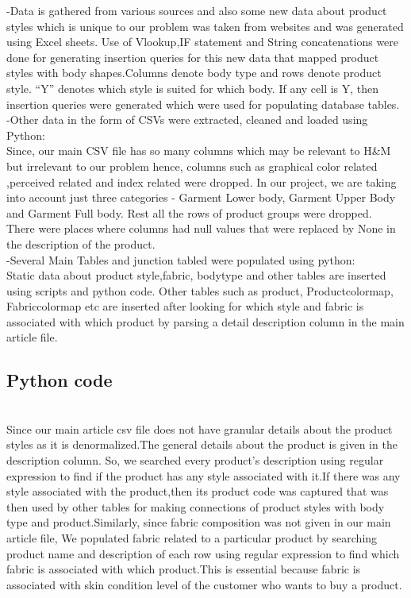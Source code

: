 \documentclass[11pt,journal,compsoc]{IEEEtran}
\begin{document}
-Data is gathered from various sources and also some new data about product styles which is unique to our problem was taken from websites and was generated using Excel sheets. Use of Vlookup,IF statement and String concatenations were done for generating insertion queries for this new data that mapped product styles with body shapes.Columns denote body type and rows denote product style. “Y” denotes which style is suited for which body. If any cell is Y, then insertion queries were generated which were used for populating database tables. \\


-Other data in the form of CSVs were extracted, cleaned and loaded using Python: \\
Since, our main CSV file has so many columns which may be relevant to H&M but irrelevant to our problem hence, columns such as graphical color related ,perceived related and index related were dropped.
In our project, we are taking into account just three categories - Garment Lower body, Garment Upper Body and Garment Full body. Rest all the rows of product groups were dropped. \\
There were places where columns had null values that were replaced by None in the description of the product. \\


-Several Main Tables and junction tabled were populated using python: \\
Static data about product style,fabric, bodytype and other tables are inserted using scripts and python code. Other tables such as product, Productcolormap, Fabriccolormap etc are inserted after looking for which style and fabric is associated with which product by parsing a detail description column in the main article file. \\


\subsection{Python code} \\
Since our main article csv file does not have granular details about the product styles as it is denormalized.The general details about the product is given in the description column. So, we searched every product’s description using regular expression to find if the product has any style associated with it.If there was any style associated with the product,then its product code was captured that was then used by other tables for making connections of product styles with body type and product.Similarly, since fabric composition was not given in our main article file, 
We populated fabric related to a particular product by searching product name and description of each row using regular expression to find which fabric is associated with which product.This is essential because fabric is associated with skin condition level of the customer who wants to buy a product. \\
\end{document}
